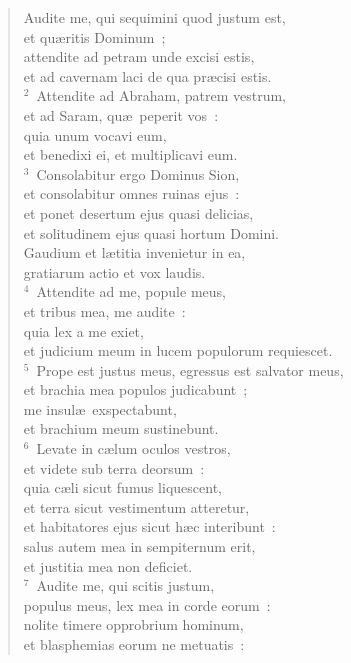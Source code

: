 \begin{flushleft}\begin{verse}\vspace{-19pt}\hspace{6pt}Audite me, qui sequimini quod justum est,\\\hspace{6pt} et qu\ae ritis Dominum~;\\ attendite ad petram unde excisi estis,\\ et ad cavernam laci de qua pr\ae cisi estis.\\
${}^{2}$~Attendite ad Abraham, patrem vestrum,\\ et ad Saram, qu\ae\ peperit vos~:\\ quia unum vocavi eum,\\ et benedixi ei, et multiplicavi eum.\\
${}^{3}$~Consolabitur ergo Dominus Sion,\\ et consolabitur omnes ruinas ejus~:\\ et ponet desertum ejus quasi delicias,\\ et solitudinem ejus quasi hortum Domini.\\ Gaudium et l\ae titia invenietur in ea,\\ gratiarum actio et vox laudis.\\
${}^{4}$~Attendite ad me, popule meus,\\ et tribus mea, me audite~:\\ quia lex a me exiet,\\ et judicium meum in lucem populorum requiescet.\\
${}^{5}$~Prope est justus meus, egressus est salvator meus,\\ et brachia mea populos judicabunt~;\\ me insul\ae\ exspectabunt,\\ et brachium meum sustinebunt.\\
${}^{6}$~Levate in c\ae lum oculos vestros,\\ et videte sub terra deorsum~:\\ quia c\ae li sicut fumus liquescent,\\ et terra sicut vestimentum atteretur,\\ et habitatores ejus sicut h\ae c interibunt~:\\ salus autem mea in sempiternum erit,\\ et justitia mea non deficiet.\\
${}^{7}$~Audite me, qui scitis justum,\\ populus meus, lex mea in corde eorum~:\\ nolite timere opprobrium hominum,\\ et blasphemias eorum ne metuatis~:\\

\end{verse}
\end{flushleft}
